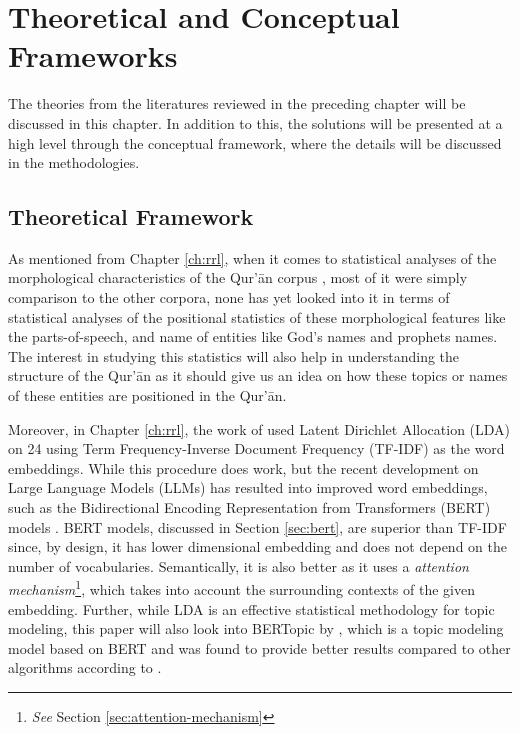 \chapter{Theoretical and Conceptual Frameworks}\label{ch:tf-cf}
The theories from the literatures reviewed in the preceding chapter will be discussed in this chapter. In addition to this, the solutions will be presented at a high level through the conceptual framework, where the details will be discussed in the methodologies.
\section{Theoretical Framework}
As mentioned from Chapter \ref{ch:rrl}, when it comes to statistical analyses of the morphological characteristics of the Qur'\=an corpus , most of it were simply comparison to the other corpora, none has yet looked into it in terms of statistical analyses of the positional statistics of these morphological features like the parts-of-speech, and name of entities like God's names and prophets names. The interest in studying this statistics will also help in understanding the structure of the Qur'\=an as it should give us an idea on how these topics or names of these entities are positioned in the Qur'\=an.

Moreover, in Chapter \ref{ch:rrl}, the work of  used Latent Dirichlet Allocation (LDA) on 24   using Term Frequency-Inverse Document Frequency (TF-IDF) as the word embeddings. While this procedure does work, but the recent development on Large Language Models (LLMs) has resulted into improved word embeddings, such as the Bidirectional Encoding Representation from Transformers (BERT) models . BERT models, discussed in Section \ref{sec:bert}, are superior than TF-IDF since, by design, it has lower dimensional embedding and does not depend on the number of vocabularies. Semantically, it is also better as it uses a \textit{attention mechanism}\footnote{\textit{See} Section \ref{sec:attention-mechanism}}, which takes into account the surrounding contexts of the given embedding. Further, while LDA is an effective statistical methodology for topic modeling, this paper will also look into BERTopic by , which is a topic modeling model based on BERT and was found to provide better results compared to other algorithms according to .

